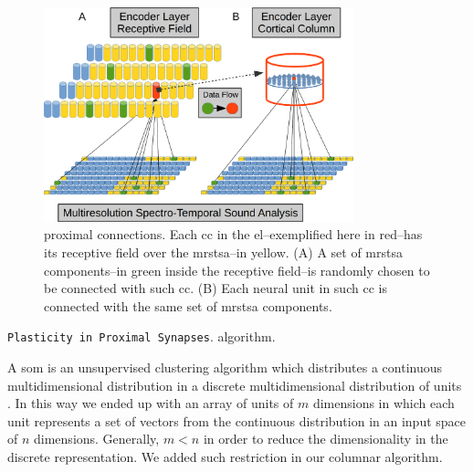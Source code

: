 {\begin{figure}[h!]
    \centering
    \includegraphics[width=0.8\textwidth]{EncoderProximalConnections.png}
    \caption{ proximal connections. Each \gls{cc} in the \gls{el}--exemplified here in red--has its receptive field over the \gls{mrstsa}--in yellow.
    (A) A set of \gls{mrstsa} components--in green inside the receptive field--is randomly chosen to be connected with such \gls{cc}.
    (B) Each neural unit in such \gls{cc} is connected with the same set of \gls{mrstsa} components.}
    \label{fig:EncoderProximalConnections}
\end{figure}


\begin{algorithm}
	\caption{\texttt{Plasticity in Proximal Synapses}.  algorithm.}
\label{csom_proximal_synapses}
\begin{algorithmic}[1]
\end{algorithmic}
\end{algorithm}

A \gls{som} is an unsupervised clustering algorithm which distributes a continuous multidimensional distribution
in a discrete multidimensional distribution of units \cite{Kohonen:1989:SAM:69371, kohonen_2082}.
In this way we ended up with an array of units of $m$ dimensions in which each unit
represents a set of vectors from the continuous distribution in an input space of $n$ dimensions.
Generally, $m < n$ in order to reduce the dimensionality in the discrete representation.
We added such restriction in our columnar algorithm.

}
